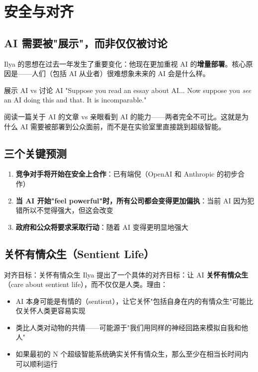 \section{安全与对齐}

\subsection{AI 需要被"展示"，而非仅仅被讨论}

Ilya 的思想在过去一年发生了重要变化：他现在更加重视 AI 的\textbf{增量部署}。核心原因是——人们（包括 AI 从业者）很难想象未来的 AI 会是什么样。

\begin{importantbox}{展示 AI vs 讨论 AI}
"Suppose you read an essay about AI... Now suppose you \textit{see} an AI doing this and that. It is incomparable."

阅读一篇关于 AI 的文章 vs 亲眼看到 AI 的能力——两者完全不可比。这就是为什么 AI 需要被部署到公众面前，而不是在实验室里直接跳到超级智能。
\end{importantbox}

\subsection{三个关键预测}

\begin{enumerate}
    \item \textbf{竞争对手将开始在安全上合作}：已有端倪（OpenAI 和 Anthropic 的初步合作）
    \item \textbf{当 AI 开始"feel powerful"时，所有公司都会变得更加偏执}：当前 AI 因为犯错所以不觉得强大，但这会改变
    \item \textbf{政府和公众将要求采取行动}：随着 AI 变得更明显地强大
\end{enumerate}

\subsection{关怀有情众生（Sentient Life）}

\begin{importantbox}{对齐目标：关怀有情众生}
Ilya 提出了一个具体的对齐目标：让 AI \textbf{关怀有情众生}（care about sentient life），而不仅仅是人类。理由：
\begin{itemize}
    \item AI 本身可能是有情的（sentient），让它关怀"包括自身在内的有情众生"可能比仅关怀人类更容易实现
    \item 类比人类对动物的共情——可能源于"我们用同样的神经回路来模拟自我和他人"
    \item 如果最初的 N 个超级智能系统确实关怀有情众生，那么至少在相当长时间内可以顺利运行
\end{itemize}
\end{importantbox}

